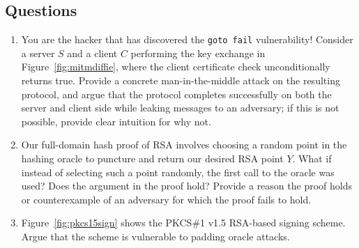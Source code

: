\subsection{Questions}

\begin{enumerate}
\item You are the hacker that has discovered the \texttt{goto fail} vulnerability!  Consider a server $S$ and a client $C$ performing the key exchange in Figure~\ref{fig:mitmdiffie}, where the client certificate check unconditionally returns true.  Provide a concrete man-in-the-middle attack on the resulting protocol, and argue that the protocol completes successfully on both the server and client side while leaking messages to an adversary; if this is not possible, provide clear intuition for why not.
\item Our full-domain hash proof of RSA involves choosing a random point in the hashing oracle to puncture and return our desired RSA point $Y$.  What if instead of selecting such a point randomly, the first call to the oracle was used?  Does the argument in the proof hold?  Provide a reason the proof holds or counterexample of an adversary for which the proof fails to hold.
\item Figure~\ref{fig:pkcs15sign} shows the PKCS\#1 v1.5 RSA-based signing scheme.  Argue that the scheme is vulnerable to padding oracle attacks.
\end{enumerate}